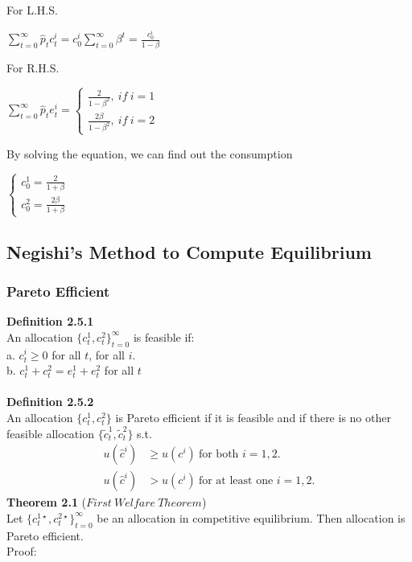 \documentclass{article}
\begin{document}
For L.H.S.\\
\centerline{$\sum\limits^\infty_{t=0}\hat{p}_t c^i_t = c^i_0\sum\limits^\infty_{t=0}\beta^t = \frac{c^i_0}{1 - \beta}$}
For R.H.S.\\
\centerline{$\sum\limits^\infty_{t=0}\hat{p}_t e^i_t = 
\left\{
		\begin{array}{lr}
	   		\frac{2}{1 - \beta^2} ,\ if\ i = 1\\
			\frac{2\beta}{1 - \beta^2} ,\ if\ i = 2
		\end{array}
\right.$}
By solving the equation, we can find out the consumption\\
\centerline{$\left\{
					\begin{array}{lr}
						c^1_0 = \frac{2}{1 + \beta}\\
						c^2_0 = \frac{2\beta}{1 + \beta}
					\end{array}
			 \right.$}


\subsection{Negishi's Method to Compute Equilibrium}
\subsubsection{Pareto Efficient}
\textbf{Definition 2.5.1}\\
An allocation $\{c^1_t, c^2_t\}^\infty_{t=0}$ is feasible if:\\
\indent a. $c^i_t \geq 0$ for all $t$, for all $i$.\\
\indent b. $c^1_t + c^2_t = e^1_t + e^2_t$ for all $t$\\\\
\textbf{Definition 2.5.2}\\
An allocation $\{c^1_t, c^2_t\}$ is Pareto efficient if it is feasible and if there is no other feasible allocation $\{\tilde{c}^1_t, \tilde{c}^2_t\}$ s.t.
\begin{align*}
	u(\hat{c}^i) &\geq u(c^i)\ \text{for both $i = 1, 2$.}\\
	u(\hat{c}^i) &> u(c^i)\ \text{for at least one $i = 1, 2$.}
\end{align*}
\textbf{Theorem 2.1} ($First\ Welfare\ Theorem$)\\
Let $\{c^{1\star}_t, c^{2\star}_t\}^\infty_{t=0}$ be an allocation in competitive equilibrium. Then allocation is Pareto efficient.\\
Proof:
\end{document}

